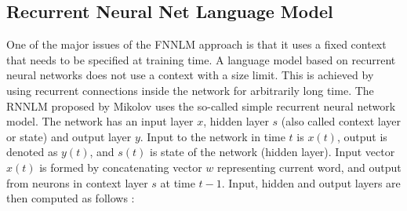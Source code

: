 




\subsection{Recurrent Neural Net Language Model}

One of the major issues of the \ac{FNNLM} approach is that
it uses a fixed context that needs to be specified at training time.
A language model based on recurrent neural networks  does not use a context
with a size limit. This is achieved by  using recurrent connections inside the network for arbitrarily long time. The \ac{RNNLM} proposed by
Mikolov uses the so-called simple 
recurrent neural network model. The network has an input layer $x$, hidden
layer $s$ (also called context layer or state) and output layer $y$. Input to
the network in time $t$ is $x(t)$, output is denoted as $y(t)$, and $s(t)$ is
state of the network (hidden layer). Input vector $x(t)$ is formed by
concatenating vector $w$ representing current word, and output from neurons in
context layer $s$ at time $t - 1$. Input, hidden and output layers are then
computed as follows \cite{conf/interspeech/MikolovKBCK10}:

